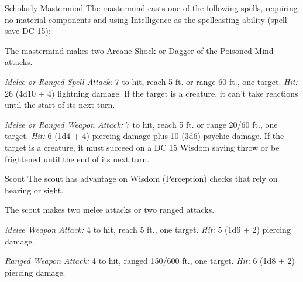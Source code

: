 \documentclass[10pt,a4paper,twoside,bg=print,twocolumn,openany,nodeprecatedcode]{dndbook}
\begin{document}
\begin{DndMonster}[float=t]{Scholarly Mastermind}
\DndMonsterBasics[
armor-class = {12},
hit-points = {\DndDice{15d8 + 15}},
speed = {30 ft.}
]
\DndMonsterAbilityScores[
 str = 10,
 dex = 14,
 con = 13,
 int = 18,
 wis = 16,
 cha = 14
]
\DndMonsterDetails[
saving-throws = {Int +7, Wis +6},
skills = {Arcana +7, History +7, Insight +6, Perception +6},
languages = {Common plus three other languages},
challenge = 5,
]
The mastermind casts one of the following spells, requiring no material components and using Intelligence as the spellcasting ability (spell save DC 15):
\begin{DndMonsterSpells}
\end{DndMonsterSpells}
The mastermind makes two Arcane Shock or Dagger of the Poisoned Mind attacks.

\textsl{Melee or Ranged Spell Attack:} 7 to hit, reach 5 ft. or range 60 ft., one target. \textsl{Hit:} 26 (4d10 + 4) lightning damage. If the target is a creature, it can't take reactions until the start of its next turn.

\textsl{Melee or Ranged Weapon Attack:} 7 to hit, reach 5 ft. or range 20/60 ft., one target. \textsl{Hit:} 6 (1d4 + 4) piercing damage plus 10 (3d6) psychic damage. If the target is a creature, it must succeed on a DC 15 Wisdom saving throw or be frightened until the end of its next turn.

\end{DndMonster}



\begin{DndMonster}[float=t]{Scout}
\DndMonsterBasics[
armor-class = {13 (\textit{leather armor})},
hit-points = {\DndDice{3d8 + 3}},
speed = {30 ft.}
]
\DndMonsterAbilityScores[
 str = 11,
 dex = 14,
 con = 12,
 int = 11,
 wis = 13,
 cha = 11
]
\DndMonsterDetails[
skills = {Nature +4, Perception +5, Stealth +6, Survival +5},
languages = {any one language (usually Common)},
challenge = 1/2,
]
The scout has advantage on Wisdom (Perception) checks that rely on hearing or sight.

The scout makes two melee attacks or two ranged attacks.

\textsl{Melee Weapon Attack:} 4 to hit, reach 5 ft., one target. \textsl{Hit:} 5 (1d6 + 2) piercing damage.

\textsl{Ranged Weapon Attack:} 4 to hit, ranged 150/600 ft., one target. \textsl{Hit:} 6 (1d8 + 2) piercing damage.

\end{DndMonster}
\end{document}
